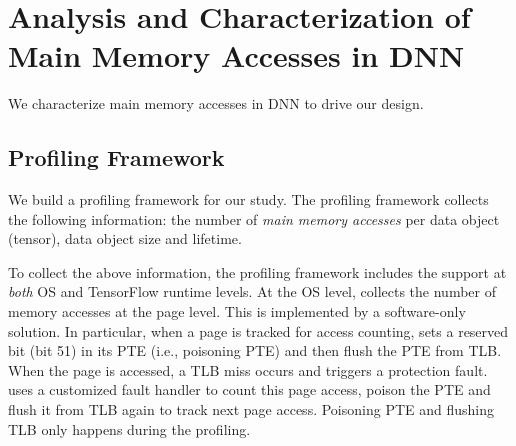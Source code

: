 \section{Analysis and Characterization of Main Memory Accesses in DNN}
\label{sec:char}
We characterize main memory accesses in DNN to drive our design.


\subsection{Profiling Framework}
\label{sec:profiling_framework}


We build a profiling framework for our study.
The profiling framework collects the following information: the number of \textit{main memory accesses} per data object (tensor), data object size and lifetime. 

To collect the above information, the profiling framework includes the support at \textit{both} OS and TensorFlow runtime levels. At the OS level, \name collects the number of memory accesses at the page level. This is implemented by a software-only solution. In particular, when a page is tracked for access counting, \name sets a reserved bit (bit 51) in its PTE (i.e., poisoning PTE) and then flush the PTE from TLB. When the page is accessed, a TLB miss occurs and triggers a protection fault. \name uses a customized fault handler to count this page access, poison the PTE and flush it from TLB again to track next page access. Poisoning PTE and flushing TLB only happens during the profiling. %



